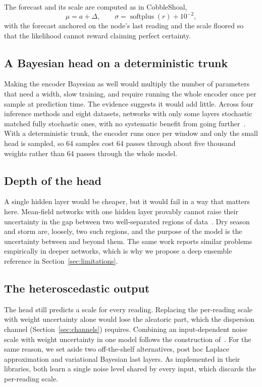 \documentclass{article}
\begin{document}
The forecast and its scale are computed as in CobbleShoal,
\begin{equation}
  \mu = a + \Delta, \qquad \sigma = \operatorname{softplus}(r) + 10^{-2},
\end{equation}
with the forecast anchored on the node's last reading and the scale floored so
that the likelihood cannot reward claiming perfect certainty.

\subsection{A Bayesian head on a deterministic trunk}
\label{sec:partial}

Making the encoder Bayesian as well would multiply the number of parameters
that need a width, slow training, and require running the whole encoder once
per sample at prediction time. The evidence suggests it would add little.
Across four inference methods and eight datasets, networks with only some
layers stochastic matched fully stochastic ones, with no systematic benefit
from going further~\citep{sharma2023stochastic}. With a deterministic trunk,
the encoder runs once per window and only the small head is sampled, so 64
samples cost 64 passes through about five thousand weights rather than 64
passes through the whole model.

\subsection{Depth of the head}
\label{sec:depth}

A single hidden layer would be cheaper, but it would fail in a way that matters
here. Mean-field networks with one hidden layer provably cannot raise their
uncertainty in the gap between two well-separated regions of
data~\citep{foong2020expressiveness}. Dry season and storm are, loosely, two
such regions, and the purpose of the model is the uncertainty between and
beyond them. The same work reports similar problems empirically in deeper
networks, which is why we propose a deep ensemble reference in
Section~\ref{sec:limitations}.

\subsection{The heteroscedastic output}
\label{sec:hetero}

The head still predicts a scale for every reading. Replacing the per-reading
scale with weight uncertainty alone would lose the aleatoric part, which the
dispersion channel (Section~\ref{sec:channels}) requires. Combining an
input-dependent noise scale with weight uncertainty in one model follows the
construction of~\citet{kendall2017uncertainties}. For the same reason, we set
aside two off-the-shelf alternatives, post hoc Laplace approximation and
variational Bayesian last layers. As implemented in their libraries, both
learn a single noise level shared by every input, which discards the
per-reading scale.
\end{document}
